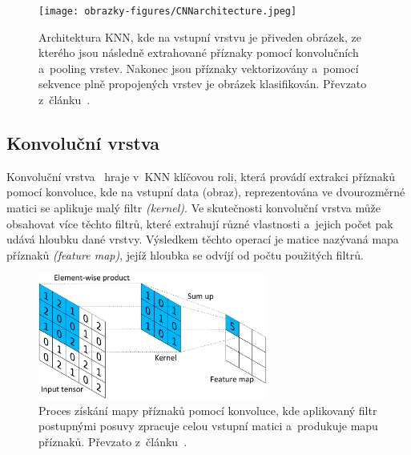 \begin{figure}[hbt]
	\centering
	\setlength{\fboxsep}{0pt}
	\texttt{[image: obrazky-figures/CNNarchitecture.jpeg]}
	\caption{Architektura KNN, kde na vstupní vrstvu je přiveden obrázek, ze kterého jsou následně extrahované příznaky pomocí konvolučních a~pooling vrstev. Nakonec jsou příznaky vektorizovány a~pomocí sekvence plně propojených vrstev je obrázek klasifikován. Převzato z~článku~\cite{website:ComprehensiveGuideToCNN}.}
	\label{img:CNN}
\end{figure}

\subsection{Konvoluční vrstva}
Konvoluční vrstva~\cite{website:CNNOverviewAndApplication} hraje v~KNN klíčovou roli, která provádí extrakci příznaků pomocí konvoluce, kde na vstupní data (obraz), reprezentována ve dvourozměrné matici se aplikuje malý filtr \emph{(kernel)}. Ve skutečnosti konvoluční vrstva může obsahovat více těchto filtrů, které extrahují různé vlastnosti a~jejich počet pak udává hloubku dané vrstvy. Výsledkem těchto operací je matice nazývaná mapa příznaků \emph{(feature map)}, jejíž hloubka se odvíjí od počtu použitých filtrů.

\begin{figure}[hbt]
	\centering
	\setlength{\fboxsep}{0pt}
	\includegraphics[width=0.67\textwidth]{obrazky-figures/convolution.pdf}
	\caption{Proces získání mapy příznaků pomocí konvoluce, kde aplikovaný filtr postupnými posuvy zpracuje celou vstupní matici a~produkuje mapu příznaků. Převzato z~článku~\cite{website:CNNOverviewAndApplication}.}
	\label{img:convolution}
\end{figure}


